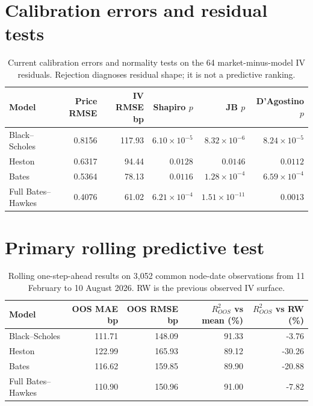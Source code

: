 \documentclass[a4paper,10pt,titlepage,oneside,openany]{book}
\theoremstyle{plain}
\theoremstyle{definition}
\theoremstyle{remark}
\begin{document}
\section*{Calibration errors and residual tests}
\begin{table}[H]
\centering
\scriptsize
\setlength{\tabcolsep}{3pt}
\begin{tabular}{@{}lrrrrr@{}}
\toprule
Model & Price RMSE & IV RMSE bp & Shapiro $p$ & JB $p$ & D'Agostino $p$ \\
\midrule
Black--Scholes & 0.8156 & 117.93 & $6.10\times10^{-5}$ & $8.32\times10^{-6}$ & $8.24\times10^{-5}$ \\
Heston & 0.6317 & 94.44 & $0.0128$ & $0.0146$ & $0.0112$ \\
Bates & 0.5364 & 78.13 & $0.0116$ & $1.28\times10^{-4}$ & $6.59\times10^{-4}$ \\
Full Bates--Hawkes & 0.4076 & 61.02 & $6.21\times10^{-4}$ & $1.51\times10^{-11}$ & $0.0013$ \\
\bottomrule
\end{tabular}
\caption{Current calibration errors and normality tests on the 64 market-minus-model IV residuals. Rejection diagnoses residual shape; it is not a predictive ranking.}
\label{tab:appendix-errors-normality}
\end{table}

\section*{Primary rolling predictive test}
\begin{table}[H]
\centering
\scriptsize
\begin{tabular}{@{}lrrrr@{}}
\toprule
Model & OOS MAE bp & OOS RMSE bp & $R^2_{OOS}$ vs mean (\%) & $R^2_{OOS}$ vs RW (\%) \\
\midrule
Black--Scholes & 111.71 & 148.09 & 91.33 & -3.76 \\
Heston & 122.99 & 165.93 & 89.12 & -30.26 \\
Bates & 116.62 & 159.85 & 89.90 & -20.88 \\
Full Bates--Hawkes & 110.90 & 150.96 & 91.00 & -7.82 \\
\bottomrule
\end{tabular}
\caption{Rolling one-step-ahead results on 3,052 common node-date observations from 11 February to 10 August 2026. RW is the previous observed IV surface.}
\label{tab:appendix-online}
\end{table}
\end{document}
